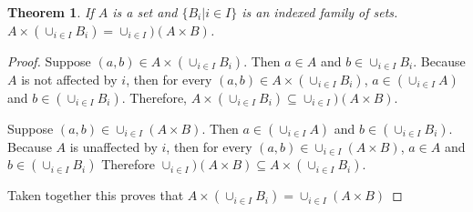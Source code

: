 

\newtheorem{theorem}{Theorem}

\begin{theorem}
  If $A$ is a set and $\{B_i | i \in I\}$ is an indexed family of sets. $A
  \times (\cup_{i\in I}B_i) =\cup_{i\in I})(A \times B)$.
\end{theorem}

\begin{proof}
  Suppose $(a,b) \in A \times (\cup_{i\in I}B_i)$. Then $a \in A$ and $b
  \in \cup_{i\in I}B_i$. Because $A$ is not affected by $i$, then for every
  $(a,b)\in A \times (\cup_{i\in I}B_i)$, $a \in (\cup_{i\in I}A)$ and $b
  \in (\cup_{i\in I}B_i)$. Therefore, $A \times (\cup_{i\in I}B_i) \subseteq
  \cup_{i\in I})(A \times B)$.

  Suppose $(a,b) \in \cup_{i\in I}(A \times B)$. Then $a \in (\cup_{i\in I}A)$
  and $b \in (\cup_{i\in I}B_i)$. Because $A$ is unaffected by $i$, then for
  every $(a,b) \in \cup_{i\in I}(A \times B)$, $a \in A$ and $b \in (\cup_{i\in I}B_i)$
  Therefore $\cup_{i\in I})(A \times B) \subseteq A \times (\cup_{i\in I}B_i)$.

  Taken together this proves that $A \times (\cup_{i\in I}B_i) =\cup_{i\in
  I}(A \times B)$
\end{proof}
